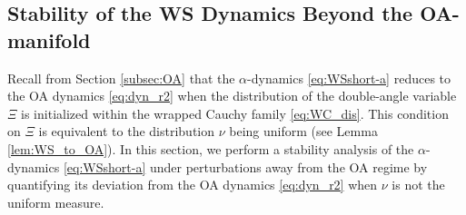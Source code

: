 \documentclass[10pt]{article}
\theoremstyle{definition}
\theoremstyle{definition}
\numberwithin{equation}{section}
\begin{document}




\subsection{Stability of the WS Dynamics Beyond the OA-manifold}\label{subsec:structural-stability}
Recall from Section \ref{subsec:OA} that the $\alpha$-dynamics \eqref{eq:WSshort-a} reduces to the OA dynamics \eqref{eq:dyn_r2} when the distribution of the double-angle variable $\Xi$ is initialized within the wrapped Cauchy family \eqref{eq:WC_dis}. 
This condition on $\Xi$ is equivalent to the distribution $\nu$ being uniform (see Lemma \ref{lem:WS_to_OA}).
In this section, we perform a stability analysis of the $\alpha$-dynamics \eqref{eq:WSshort-a} under perturbations away from the OA regime by quantifying its deviation from the OA dynamics \eqref{eq:dyn_r2} when $\nu$ is not the uniform measure.
\end{document}

